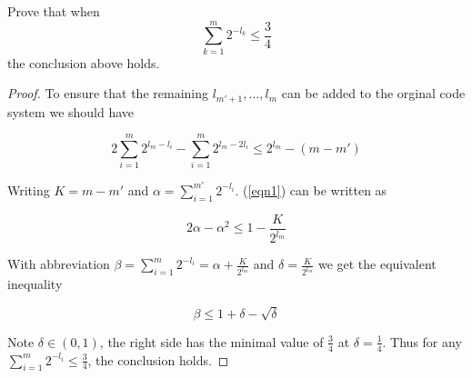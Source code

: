 \begin{exercise}{ Prove that when
  $$\sum_{k=1}^{m} 2^{-l_{k}} \leq \frac{3}{4}$$  the conclusion above holds.}
\begin{proof}
    To ensure that the remaining $l_{m'+1},\ldots,l_m$ can be added to the orginal code system we should have

    \begin{equation}
      2 \sum_{i=1}^{m} 2^{l_m -l_i}- \sum_{i=1}^{m}2^{l_m - 2l_i} \le 2^{l_m} - (m -m')
      \label{eqn1}
    \end{equation}

    Writing $K = m - m'$ and $\alpha = \sum_{i=1}^{m'} 2^{-l_i}$. (\ref{eqn1}) can be written as

    \begin{equation}
      2\alpha - \alpha^2 \le 1 - \frac{K}{2^{l_m}}
    \end{equation}

    With abbreviation $\beta = \sum_{i=1}^{m} 2^{-l_i} = \alpha + \frac{K}{2^{l_m}}$ and $\delta = \frac{K}{2^{l_m}}$ we get the equivalent inequality

    \begin{equation}
      \beta \le 1+\delta - \sqrt{\delta}
    \end{equation}

    Note $\delta \in (0,1)$, the right side has the minimal value of $\frac{3}{4}$ at $\delta = \frac{1}{4}$. Thus for any $ \sum_{i=1}^{m} 2^{-l_i} \le \frac{3}{4}$, the conclusion holds.

  \end{proof}
  \label{ex3}
\end{exercise}

